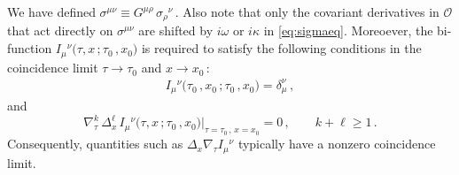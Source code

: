 \documentclass[11pt]{article}
\newcommand{\be}{\begin{equation}}
\newcommand{\ee}{\end{equation}}
\newcommand{\CO}{\mathcal{O}}
\begin{document}
%
We have defined
%
$\sigma^{\mu\nu} \equiv G^{\mu\rho} \, \sigma_{\rho}{}^\nu$\,.
%
Also note that only the covariant derivatives in $\CO$ that act directly on $\sigma^{\mu\nu}$ are shifted by $i \omega$ or $i \kappa$ in \eqref{eq:sigmaeq}. 
Moreoever, the bi-function $I_\mu{}^\nu \bigl( \tau, x\,; \tau^{}_0\,, x^{}_0 \bigr)$ is required to satisfy the following conditions in the coincidence limit $\tau \rightarrow \tau^{}_0$ and $x \rightarrow x^{}_0$\,:
%
\begin{align} \label{eq:coinI}
	I_\mu{}^\nu \bigl( \tau^{}_0\,, x^{}_0\,; \tau^{}_0\,, x^{}_0 \bigr) = \delta_\mu^\nu\,,
\end{align}
%
and
%
\be
	\nabla_{\!\tau}^k \, \Delta_x^\ell \, I_\mu{}^\nu \bigl( \tau, x\,; \tau^{}_0\,, x^{}_0 \bigr) \big|_{\tau = \tau^{}_0\,, \, x = x^{}_0} = 0\,,
		\qquad
	k + \ell \geq 1\,.
\ee
%
Consequently, quantities such as $\Delta_x \nabla_{\!\tau} I_\mu{}^\nu$ typically have a nonzero coincidence limit. 
\end{document}
